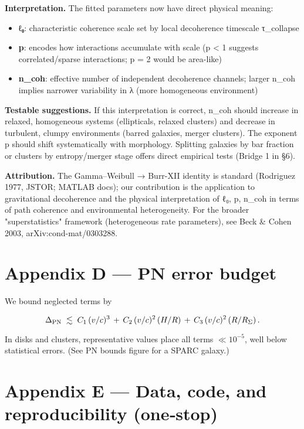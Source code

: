 \documentclass[11pt,a4paper]{article}
\begin{document}
\textbf{Interpretation.} The fitted parameters now have direct physical meaning:  

\begin{itemize}
\item \textbf{ℓ₀}: characteristic coherence scale set by local decoherence timescale τ\_collapse
\item \textbf{p}: encodes how interactions accumulate with scale (p < 1 suggests correlated/sparse interactions; p = 2 would be area-like)
\item \textbf{n\_coh}: effective number of independent decoherence channels; larger n\_coh implies narrower variability in λ (more homogeneous environment)
\end{itemize}


\textbf{Testable suggestions.} If this interpretation is correct, n\_coh should increase in relaxed, homogeneous systems (ellipticals, relaxed clusters) and decrease in turbulent, clumpy environments (barred galaxies, merger clusters). The exponent p should shift systematically with morphology. Splitting galaxies by bar fraction or clusters by entropy/merger stage offers direct empirical tests (Bridge 1 in §6).


\textbf{Attribution.} The Gamma–Weibull → Burr-XII identity is standard (Rodriguez 1977, JSTOR; MATLAB docs); our contribution is the application to gravitational decoherence and the physical interpretation of {ℓ₀, p, n\_coh} in terms of path coherence and environmental heterogeneity. For the broader "superstatistics" framework (heterogeneous rate parameters), see Beck \& Cohen 2003, arXiv:cond-mat/0303288.


\section{Appendix D — PN error budget}


We bound neglected terms by


\begin{equation}
\Delta_{\rm PN} \;\lesssim\; C_1\,(v/c)^3 \, + \, C_2\,(v/c)^2\,(H/R) \, + \, C_3\,(v/c)^2\,(R/R_\Sigma)\,.
\end{equation}


In disks and clusters, representative values place all terms $\ll10^{-5}$, well below statistical errors. (See PN bounds figure for a SPARC galaxy.)


\section{Appendix E — Data, code, and reproducibility (one‑stop)}
\end{document}
